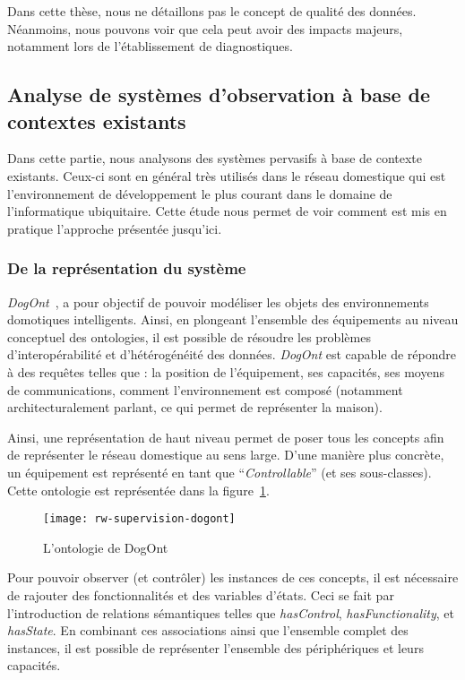 Dans cette thèse, nous ne détaillons pas le concept de qualité des données. Néanmoins, nous pouvons voir que cela peut avoir des impacts majeurs, notamment lors de l'établissement de diagnostiques.

\subsection{Analyse de systèmes d'observation à base de contextes existants}
Dans cette partie, nous analysons des systèmes pervasifs à base de contexte existants. Ceux-ci sont en général très utilisés dans le réseau domestique qui est l'environnement de développement le plus courant dans le domaine de l'informatique ubiquitaire. Cette étude nous permet de voir comment est mis en pratique l'approche présentée jusqu'ici.

\subsubsection{De la représentation du système}
\textit{DogOnt}~\cite{Bonino:dogont}, a pour objectif de pouvoir modéliser les objets des environnements domotiques intelligents. Ainsi, en plongeant l'ensemble des équipements au niveau conceptuel des ontologies, il est possible de résoudre les problèmes d'interopérabilité et d'hétérogénéité des données. \textit{DogOnt} est capable de répondre à des requêtes telles que : la position de l'équipement, ses capacités, ses moyens de communications, comment l'environnement est composé (notamment architecturalement parlant, ce qui permet de représenter la maison).

Ainsi, une représentation de haut niveau permet de poser tous les concepts afin de représenter le réseau domestique au sens large. D'une manière plus concrète, un équipement est représenté en tant que \enquote{\it Controllable} (et ses sous-classes). Cette ontologie est représentée dans la figure~\ref{fig:rw:supervision:dogont}.

\begin{figure}[ht]
    \centering
    \texttt{[image: rw-supervision-dogont]}
    \caption{L'ontologie de DogOnt}\label{fig:rw:supervision:dogont}
\end{figure}
Pour pouvoir observer (et contrôler) les instances de ces concepts, il est nécessaire de rajouter des fonctionnalités et des variables d'états. Ceci se fait par l'introduction de relations sémantiques telles que \textit{hasControl}, \textit{hasFunctionality}, et \textit{hasState}. En combinant ces associations ainsi que l'ensemble complet des instances, il est possible de représenter l'ensemble des périphériques et leurs capacités.


